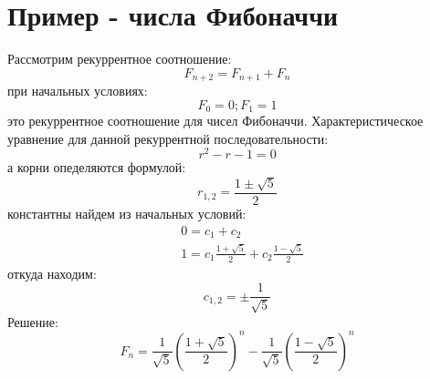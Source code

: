 \section{Пример - числа Фибоначчи}

Рассмотрим рекуррентное соотношение:
\begin{equation}
	F_{n+2} = F_{n+1} + F_n
\end{equation}
при начальных условиях:
\[
	F_0 = 0; F_1 = 1
\]
это рекуррентное соотношение для чисел Фибоначчи. Характеристическое уравнение для данной рекуррентной последовательности:
\begin{equation}
	r^2 - r -1 = 0
\end{equation}
а корни опеделяются формулой:
\[
	r_{1,2} = \frac{1\pm \sqrt{5}}{2}
\]
константны найдем из начальных условий:
\[
	\begin{split}
		&0 = c_1 + c_2\\
		&1 = c_1 \frac{1+\sqrt{5}}{2} + c_2 \frac{1-\sqrt{5}}{2}
	\end{split}
\]
откуда находим:
\[
	c_{1,2} = \pm \frac{1}{\sqrt{5}}
\]
Решение:
\begin{equation}
	F_n = \frac{1}{\sqrt{5}}\left(\frac{1+\sqrt{5}}{2}\right)^n - \frac{1}{\sqrt{5}}\left(\frac{1-\sqrt{5}}{2}\right)^n
\end{equation}
